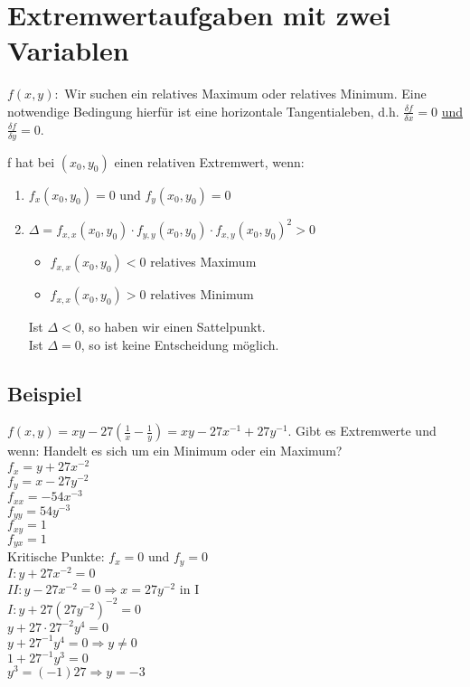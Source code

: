 \section{Extremwertaufgaben mit zwei Variablen}
$ f(x,y): $ Wir suchen ein relatives Maximum oder relatives Minimum. Eine notwendige Bedingung hierfür ist eine horizontale Tangentialeben, d.h. $ \frac{\delta f}{\delta x} = 0 $ \underline{und} $ \frac{\delta f}{\delta y} = 0 $. 

\begin{satz}[Rezept]
f hat bei $ (x_0,y_0)$ einen relativen Extremwert, wenn: 
\begin{enumerate}
\item $f_x(x_0,y_0) = 0$ und $f_y(x_0,y_0) = 0$
\item $\Delta = f_{x,x}(x_0,y_0)\cdot f_{y,y}(x_0,y_0)\cdot f_{x,y}(x_0,y_0)^2 > 0 $
	\begin{itemize}
	\item $f_{x,x}(x_0,y_0) < 0$ relatives Maximum 
	\item $f_{x,x}(x_0,y_0) > 0$ relatives Minimum
	\end{itemize}
	Ist $\Delta < 0$, so haben wir einen Sattelpunkt.\\
	Ist $\Delta = 0$, so ist keine Entscheidung möglich. 
\end{enumerate}
\end{satz}

\subsection{Beispiel}
$ f(x,y)= x y - 27(\frac{1}{x} - \frac{1}{y}) = x y - 27 x^{-1} + 27 y^{-1}$. 
Gibt es Extremwerte und wenn: Handelt es sich um ein Minimum oder ein Maximum?\\

$f_x = y + 27 x^{-2}$\\
$f_y = x - 27 y^{-2}$\\
$f_{xx} = -54 x^{-3}$\\
$f_{yy} = 54 y^{-3}$\\
$f_{xy} = 1$\\
$f_{yx} = 1$\\
Kritische Punkte: $f_x=0$ und $f_y=0$\\
$I: y+27x^{-2}=0$\\
$II: y-27x^{-2}=0 \Rightarrow x = 27 y ^{-2} $ in I\\
$I: y+27(27 y^{-2})^{-2} = 0 $\\
$y+27 \cdot 27^{-2} y^4 = 0 $\\
$y+27^{-1} y^4 = 0 \Rightarrow y \neq 0$\\
$1+27^{-1} y^3=0$\\
$y^3=(-1)27 \Rightarrow y=-3$\\


